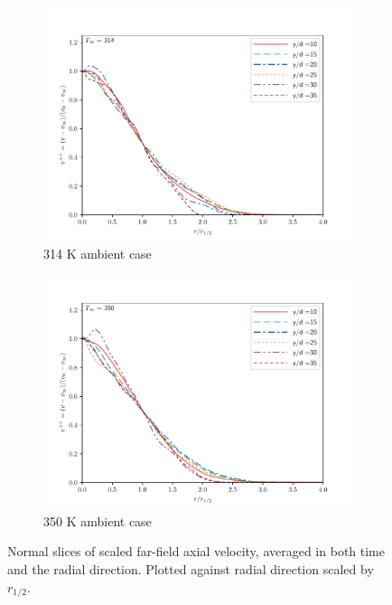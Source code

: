 \begin{figure}[H]
\begin{center}
\begin{subfigure}{0.45\textwidth}
	\includegraphics[scale=.45]{figures/Plots/radial/slices_5/314_ambient/r_vs_v.pdf}
	\caption{314 K ambient case} \label{noniso_far_r_vs_v_1}
\end{subfigure}
\begin{subfigure}{0.45\textwidth}
	\includegraphics[scale=.45]{figures/Plots/radial/slices_5/350_ambient/r_vs_v.pdf}
	\caption{350 K ambient case} \label{noniso_far_r_vs_v_2}
\end{subfigure}
\caption{Normal slices of scaled far-field axial velocity, averaged in both time and the radial direction. Plotted against radial direction scaled by $r_{1/2}$.}
\label{noniso_far_r_v_features}
\end{center}
\end{figure}

